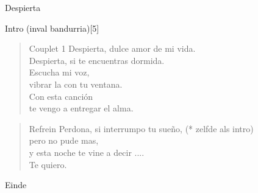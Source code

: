 \begin{song}[tango]{Despierta}


\begin{instrumental}{Intro \textnormal{(inval bandurria)}}[5]
    
   
\end{instrumental}{}

\begin{verse}{Couplet 1}
  Despierta, dulce amor de mi vida.\\
  Despierta, si te encuentras dormida. \\
  Escucha mi voz, \chord{}   \\
  vibrar la con tu ventana.  \\
  Con esta canci\'{o}n \chord{}   \\
  te vengo a entregar el alma.
\end{verse}

\begin{verse}{Refrein}
  Perdona, \hspace{4em} si interrumpo tu sue\~{n}o,  \hspace{3em} (* zelfde als intro)\\
  pero no pude mas,  \\
  y esta noche te vine a decir ....  \\
  Te quiero.
\end{verse}


\begin{instrumental}{Einde}
\end{instrumental}

\end{song}

